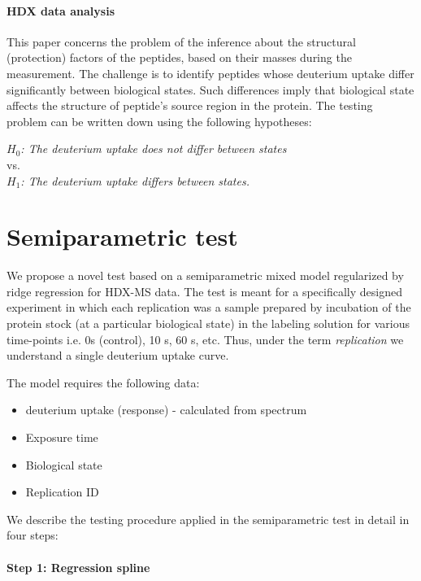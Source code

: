 \documentclass[]{MathAppl18}
\begin{document}
\paragraph{HDX data analysis} 

This paper concerns the problem of the inference about the structural (protection) factors of the peptides, based on their masses during the measurement. The challenge is to identify peptides whose deuterium uptake differ significantly between biological states. Such differences imply that biological state affects the structure of peptide's source region in the protein. The testing problem can be written down using the following hypotheses:
\begin{center}
    \textit{$H_0$: The deuterium uptake does not differ between states}\\
    vs.\\
    \textit{$H_1$: The deuterium uptake differs between states.}
\end{center}

\section{Semiparametric test}


We propose a novel test based on a semiparametric mixed model regularized by ridge regression for HDX-MS data. The test is meant for a specifically designed experiment in which each replication was a sample prepared by incubation of the protein stock (at a particular biological state) in the labeling solution for various time-points i.e. 0s (control), 10 s, 60 s, etc. Thus, under the term \textit{replication} we understand a single deuterium uptake curve.

The model requires the following data:
\begin{itemize}
    \item deuterium uptake (response) - calculated from spectrum
    \item Exposure time
    \item Biological state
    \item Replication ID
\end{itemize}
We describe the testing procedure applied in the semiparametric test in detail in four steps:

\paragraph{Step 1: Regression spline}
\end{document}
